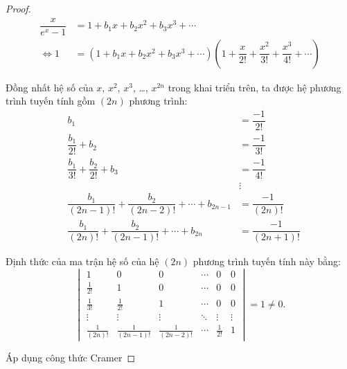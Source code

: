 \documentclass[class=linear-algebra,crop=false]{standalone}
\begin{document}
\begin{proof}
	\begingroup{}
	\allowdisplaybreaks{}
	\begin{align*}
		\dfrac{x}{e^{x}-1} & = 1 + b_{1}x + b_{2}x^{2} + b_{3}x^{3} + \cdots                                                                                  \\
		\Leftrightarrow 1  & = (1 + b_{1}x + b_{2}x^{2} + b_{3}x^{3} + \cdots)\left(1 + \dfrac{x}{2!} + \dfrac{x^{2}}{3!} + \dfrac{x^{3}}{4!} + \cdots\right)
	\end{align*}
	\endgroup{}
	\par Đồng nhất hệ số của $x$, $x^{2}$, $x^{3}$, \ldots, $x^{2n}$ trong khai triển trên, ta được hệ phương trình tuyến tính gồm $(2n)$ phương trình:
	\begin{align*}
		 & b_{1}                                                               & = \dfrac{-1}{2!}      \\
		 & \dfrac{b_{1}}{2!} + b_{2}                                           & = \dfrac{-1}{3!}      \\
		 & \dfrac{b_{1}}{3!} + \dfrac{b_{2}}{2!} + b_{3}                       & = \dfrac{-1}{4!}      \\
		 &                                                                     & \vdots                \\
		 & \dfrac{b_{1}}{(2n-1)!} + \dfrac{b_{2}}{(2n-2)!} + \cdots + b_{2n-1} & = \dfrac{-1}{(2n)!}   \\
		 & \dfrac{b_{1}}{(2n)!} + \dfrac{b_{2}}{(2n-1)!} + \cdots + b_{2n}     & = \dfrac{-1}{(2n+1)!}
	\end{align*}
	\par Định thức của ma trận hệ số của hệ $(2n)$ phương trình tuyến tính này bằng:
	\[
		\begin{vmatrix}
			1               & 0                 & 0                 & \cdots & 0            & 0      \\
			\frac{1}{2!}    & 1                 & 0                 & \cdots & 0            & 0      \\
			\frac{1}{3!}    & \frac{1}{2!}      & 1                 & \cdots & 0            & 0      \\
			\vdots          & \vdots            & \vdots            & \ddots & \vdots       & \vdots \\
			\frac{1}{(2n)!} & \frac{1}{(2n-1)!} & \frac{1}{(2n-2)!} & \cdots & \frac{1}{2!} & 1
		\end{vmatrix} = 1 \ne 0.
	\]
	\par Áp dụng công thức Cramer

\end{proof}
\end{document}
